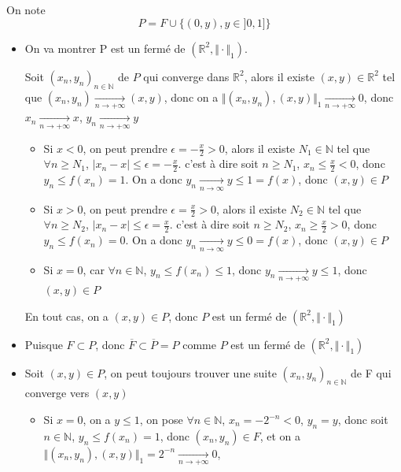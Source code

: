 \documentclass[a4paper,12pt]{book}
\begin{document}
\subsection{}
On note 
$$
P=F\cup \{(0,y),y\in ]0,1]\}
$$
\begin{itemize}
    \item On va montrer P est un fermé de $(\mathbb{R}^2,\Vert\cdot\Vert_1)$. 
    
    Soit $(x_n,y_n)_{n \in \mathbb{N}}$ de $P$ qui converge dans $\mathbb{R}^2$, alors il existe $(x,y) \in \mathbb{R}^2$ tel que $(x_n,y_n) \xrightarrow[n \to +\infty]{}(x,y)$, 
    donc on a $\Vert(x_n,y_n),(x,y)\Vert _1 \xrightarrow[n \to +\infty]{}0$, donc $x_n\xrightarrow[n \to +\infty]{}x$, $y_n\xrightarrow[n \to +\infty]{}y$
    \begin{itemize}
        \item Si $x<0$, on peut prendre $\epsilon=-\frac{x}{2}>0$, alors il existe $N_1 \in \mathbb{N}$ tel que $\forall n \geq N_1$, $|x_n-x|\leq \epsilon=-\frac{x}{2}$. 
        c'est à dire soit $n \geq N_1$, $x_n\leq \frac{x}{2}<0$, donc $y_n\leq f(x_n)=1$. On a donc $y_n \xrightarrow[n \to \infty]{}y\leq 1=f(x)$, donc $(x,y) \in P$
        \item Si $x>0$, on peut prendre $\epsilon=\frac{x}{2}>0$, alors il existe $N_2 \in \mathbb{N}$ tel que $\forall n \geq N_2$, $|x_n-x|\leq \epsilon=\frac{x}{2}$. 
        c'est à dire soit $n \geq N_2$, $x_n \geq \frac{x}{2}>0$, donc $y_n\leq f(x_n)=0$. On a donc $y_n \xrightarrow[n \to \infty]{}y\leq 0=f(x)$, donc $(x,y) \in P$
        \item Si $x=0$, car $\forall n \in \mathbb{N}$, $y_n \leq f(x_n)\leq 1$, donc $y_n \xrightarrow[n \to +\infty]{} y \leq 1$, donc $(x,y) \in P$
    \end{itemize}
    En tout cas, on a $(x,y)\in P$, donc $P$  est un fermé de $(\mathbb{R}^2,\Vert\cdot\Vert_1)$
    \item Puisque $F \subset P$, donc $\overline{F} \subset \overline{P}=P$ comme $P$ est un fermé de $(\mathbb{R}^2,\Vert\cdot\Vert_1)$
    \item Soit $(x,y)\in P$, on peut toujours trouver une suite $(x_n,y_n)_{n \in \mathbb{N}}$ de F qui converge vers $(x,y)$
    \begin{itemize}
        \item Si $x=0$, on a $y \leq 1$, on pose $\forall n \in \mathbb{N}$, $x_n=-2^{-n}<0$, $y_n=y$, donc soit $n \in \mathbb{N}$, $y_n \leq f(x_n)=1$, donc $(x_n,y_n) \in F$, et on a $\Vert(x_n,y_n),(x,y)\Vert_1=2^{-n}\xrightarrow[n \to +\infty]{}0$, 

\end{itemize}
\end{itemize}
\end{document}

